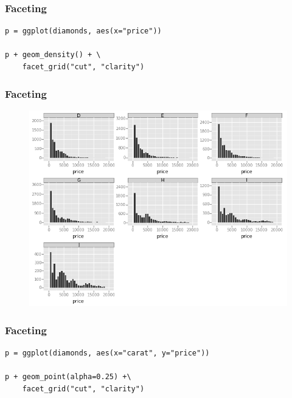 \documentclass{beamer}
\begin{document}
\begin{frame}[fragile]
	\frametitle{Faceting}
	\large
	\begin{framed}
		\begin{verbatim}
p = ggplot(diamonds, aes(x="price"))

p + geom_density() + \
    facet_grid("cut", "clarity")
		\end{verbatim}
		
	\end{framed}
\end{frame}
\begin{frame}
\frametitle{Faceting}
	\begin{figure}
		\centering
		\includegraphics[width=0.9\linewidth]{Facet3}
		\caption{}
		\label{fig:Facet3}
	\end{figure}
	
\end{frame}
\begin{frame}[fragile]
\frametitle{Faceting}
\large
	\begin{framed}
		\begin{verbatim}
p = ggplot(diamonds, aes(x="carat", y="price"))

p + geom_point(alpha=0.25) +\
    facet_grid("cut", "clarity")
	\end{verbatim}
	
\end{framed}
\end{frame}
\end{document}
